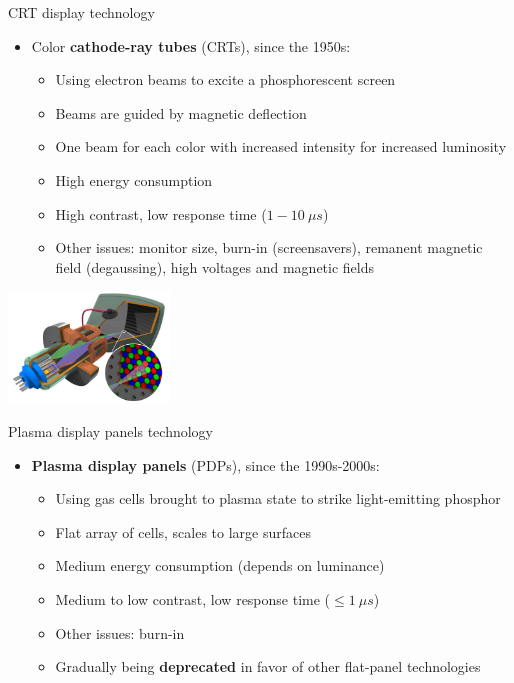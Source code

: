 \begin{frame}{CRT display technology}
  \begin{itemize}
  \item Color \textbf{cathode-ray tubes} (CRTs), since the 1950s:
    \begin{itemize}
    \item Using electron beams to excite a phosphorescent screen
    \item Beams are guided by magnetic deflection
    \item One beam for each color with increased intensity for increased luminosity
    \item High energy consumption
    \item High contrast, low response time (\(1-10~\mu s\))
    \item Other issues: monitor size, burn-in (screensavers), remanent magnetic field (degaussing), high voltages and magnetic fields
    \end{itemize}
  \end{itemize}

  \begin{center}
  \includegraphics[height=8em]{slides/graphics-hardware/crt-color.png}
  \end{center}
\end{frame}

\begin{frame}{Plasma display panels technology}
  \begin{itemize}
  \item \textbf{Plasma display panels} (PDPs), since the 1990s-2000s:
    \begin{itemize}
    \item Using gas cells brought to plasma state to strike light-emitting phosphor
    \item Flat array of cells, scales to large surfaces
    \item Medium energy consumption (depends on luminance)
    \item Medium to low contrast, low response time (\(\leq 1~\mu s\))
    \item Other issues: burn-in
    \item Gradually being \textbf{deprecated} in favor of other flat-panel technologies
    \end{itemize}
  \end{itemize}
\end{frame}

